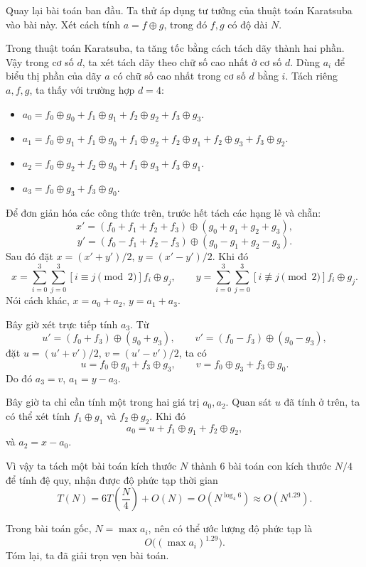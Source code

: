 \documentclass[11pt]{article}
\begin{document}
Quay lại bài toán ban đầu. Ta thử áp dụng tư tưởng của thuật toán Karatsuba vào
bài này. Xét cách tính \(a=f\oplus g\), trong đó \(f,g\) có độ dài \(N\).

Trong thuật toán Karatsuba, ta tăng tốc bằng cách tách dãy thành hai phần.
Vậy trong cơ số \(d\), ta xét tách dãy theo chữ số cao nhất ở cơ số \(d\). Dùng
\(a_i\) để biểu thị phần của dãy \(a\) có chữ số cao nhất trong cơ số \(d\)
bằng \(i\). Tách riêng \(a,f,g\), ta thấy với trường hợp \(d=4\):

\begin{itemize}
  \item \(a_0=f_0\oplus g_0+f_1\oplus g_1+f_2\oplus g_2+f_3\oplus g_3\).
  \item \(a_1=f_0\oplus g_1+f_1\oplus g_0+f_1\oplus g_2+f_2\oplus g_1
  +f_2\oplus g_3+f_3\oplus g_2\).
  \item \(a_2=f_0\oplus g_2+f_2\oplus g_0+f_1\oplus g_3+f_3\oplus g_1\).
  \item \(a_3=f_0\oplus g_3+f_3\oplus g_0\).
\end{itemize}

Để đơn giản hóa các công thức trên, trước hết tách các hạng lẻ và chẵn:
\[
  x'=(f_0+f_1+f_2+f_3)\oplus(g_0+g_1+g_2+g_3),
\]
\[
  y'=(f_0-f_1+f_2-f_3)\oplus(g_0-g_1+g_2-g_3).
\]
Sau đó đặt \(x=(x'+y')/2\), \(y=(x'-y')/2\). Khi đó
\[
  x=\sum_{i=0}^{3}\sum_{j=0}^{3}[i\equiv j\pmod 2]f_i\oplus g_j,\qquad
  y=\sum_{i=0}^{3}\sum_{j=0}^{3}[i\not\equiv j\pmod 2]f_i\oplus g_j.
\]
Nói cách khác, \(x=a_0+a_2\), \(y=a_1+a_3\).

Bây giờ xét trực tiếp tính \(a_3\). Từ
\[
  u'=(f_0+f_3)\oplus(g_0+g_3),\qquad
  v'=(f_0-f_3)\oplus(g_0-g_3),
\]
đặt \(u=(u'+v')/2\), \(v=(u'-v')/2\), ta có
\[
  u=f_0\oplus g_0+f_3\oplus g_3,\qquad
  v=f_0\oplus g_3+f_3\oplus g_0.
\]
Do đó \(a_3=v\), \(a_1=y-a_3\).

Bây giờ ta chỉ cần tính một trong hai giá trị \(a_0,a_2\). Quan sát \(u\) đã
tính ở trên, ta có thể xét tính \(f_1\oplus g_1\) và \(f_2\oplus g_2\). Khi đó
\[
  a_0=u+f_1\oplus g_1+f_2\oplus g_2,
\]
và \(a_2=x-a_0\).

Vì vậy ta tách một bài toán kích thước \(N\) thành \(6\) bài toán con kích
thước \(N/4\) để tính đệ quy, nhận được độ phức tạp thời gian
\[
  T(N)=6T\left(\frac{N}{4}\right)+O(N)
  =
  O(N^{\log_4 6})
  \approx O(N^{1.29}).
\]

Trong bài toán gốc, \(N=\max a_i\), nên có thể ước lượng độ phức tạp là
\[
  O\bigl((\max a_i)^{1.29}\bigr).
\]
Tóm lại, ta đã giải trọn vẹn bài toán.
\end{document}
